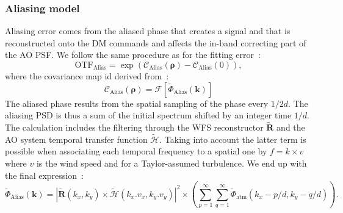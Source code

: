 \documentclass[12pt]{article}
\newcommand{\module}[1]{\left\vert #1 \right\vert}
\newcommand{\para}[1]{\left(#1\right)}
\newcommand{\cro}[1]{\left[#1\right]}
\newcommand{\R}{\boldsymbol{\text{R}}}
\newcommand{\rhob}{\boldsymbol{\rho}}
\newcommand{\otf}[1]{\text{OTF}_{#1}}
\begin{document}
\subsubsection{Aliasing model}
Aliasing error comes from the aliased phase that creates a signal and that is reconstructed onto the DM commands and affects the in-band correcting part of the AO PSF. We follow the same procedure as for the fitting error~:
\begin{equation}
\otf{\text{Alias}} = \exp(\mathcal{C}_{\text{Alias}}(\rhob) - \mathcal{C}_{\text{Alias}}(0) ),
\end{equation}
where the covariance map id derived from~:
\begin{equation} \label{E:covalias}
\mathcal{C}_{\text{Alias}}(\rhob) = \mathcal{F}\cro{\tilde{\Phi}_\text{Alias}(\boldsymbol{k})}
\end{equation}
The aliased phase results from the spatial sampling of the phase every $1/2d$. The aliasing PSD is thus a sum of the initial spectrum shifted by an integer time $1/d$. The calculation includes the filtering through the WFS reconstructor $\tilde{\R}$ and the AO system temporal transfer function $\tilde{\mathcal{H}}$. Taking into account the latter term is possible when associating each temporal frequency to a spatial one by $f=k\times v$ where $v$ is the wind speed and for a Taylor-assumed turbulence. We end up with the final expression~:
\begin{equation}
\tilde{\Phi}_\text{Alias}(\boldsymbol{k}) = \module{\tilde{\R}(k_x,k_y)\times\tilde{\mathcal{H}}(k_x.v_x,k_y.v_y)}^2\times\para{\sum_{p=1}^{\infty} \sum_{q=1}^{\infty}\tilde{\Phi}_\text{atm}(k_x - p/d,k_y-q/d)}.
\end{equation}
\end{document}
